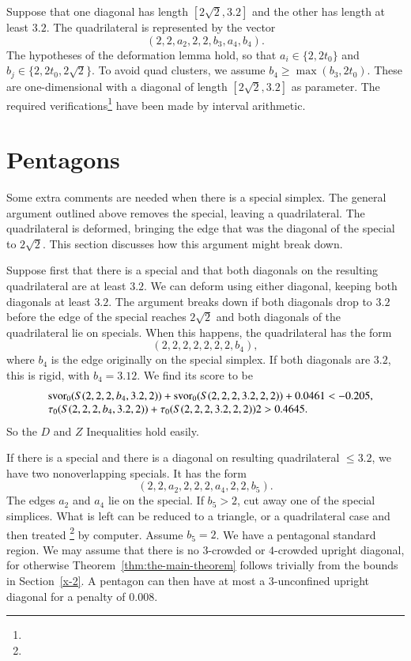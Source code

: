 Suppose that one diagonal has length $[2\sqrt{2},3.2]$ and the other has
length at least $3.2$.  The quadrilateral is represented by the vector
    $$(2,2,a_2,2,2,b_3,a_4,b_4).$$
The hypotheses of the deformation lemma hold, so that $a_i\in\{2,2t_0\}$
and $b_j\in\{2,2t_0,2\sqrt2\}$. To avoid quad clusters, we assume
$b_4\ge\max(b_3,2t_0)$. These are one-dimensional with a diagonal of
length $[2\sqrt{2},3.2]$ as parameter.
 The required verifications\footnote{} %
have been made by interval arithmetic.


\section{Pentagons} %

Some extra comments are needed when there is a special simplex. The
general argument outlined above removes the special, leaving a
quadrilateral.  The quadrilateral is deformed, bringing the edge that
was the diagonal of the special to $2\sqrt{2}$. This section discusses
how this argument might break down.

Suppose first that there is a special and that both diagonals on the
resulting quadrilateral are at least $3.2$.  We can deform using either
diagonal, keeping both diagonals at least $3.2$. The argument breaks
down if both diagonals drop to $3.2$ before the edge of the special
reaches $2\sqrt{2}$ and both diagonals of the quadrilateral lie on
specials. When this happens, the quadrilateral has the form
    $$(2,2,2,2,2,2,2,b_4),$$
where $b_4$ is the edge originally on the special simplex.  If both
diagonals are $3.2$, this is rigid, with $b_4= 3.12$. We find its score
to be
    $$
    \begin{array}{lll}
    &\operatorname{svor}_0(S(2,2,2,b_4,3.2,2))+\operatorname{svor}_0(S(2,2,2,3.2,2,2))+0.0461<-0.205,\\
    &\tau_0(S(2,2,2,b_4,3.2,2))+\tau_0(S(2,2,2,3.2,2,2))2> 0.4645.\\
    \end{array}
    $$
So the $D$ and $Z$ Inequalities hold easily.

If there is a special and there is a diagonal on resulting quadrilateral
$\le3.2$, we have two nonoverlapping specials.  It has the form
    $$(2,2,a_2,2,2,2,a_4,2,2,b_5).$$
The edges $a_2$ and $a_4$ lie on the special.  If $b_5>2$, cut
away one of the special simplices.  What is left can be reduced to
a triangle, or a quadrilateral case and then treated%
\footnote{} %
by computer. %
Assume
$b_5=2$.  We have a pentagonal standard region. We may assume that
there is no $3$-crowded or $4$-crowded upright diagonal, for
otherwise Theorem~\ref{thm:the-main-theorem} follows trivially
from the bounds in Section~\ref{x-2}. A pentagon can then have at
most a $3$-unconfined upright diagonal for a penalty of $0.008$.

